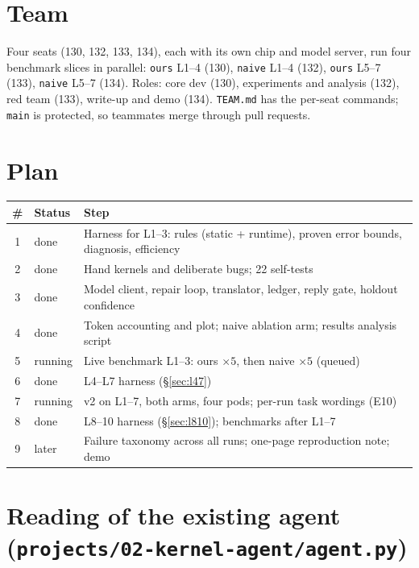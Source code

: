\documentclass[11pt]{article}
\newcommand{\code}[1]{\texttt{#1}}
\begin{document}
\section{Team}
Four seats (130, 132, 133, 134), each with its own chip and model server, run four benchmark slices
in parallel: \code{ours} L1--4 (130), \code{naive} L1--4 (132), \code{ours} L5--7 (133),
\code{naive} L5--7 (134). Roles: core dev (130), experiments and analysis (132), red team (133),
write-up and demo (134). \code{TEAM.md} has the per-seat commands; \code{main} is protected, so
teammates merge through pull requests.

\section{Plan}
\label{sec:plan}

\begin{tabularx}{\linewidth}{@{}clY@{}}
\toprule
\# & Status & Step \\
 & done & Harness for L1--3: rules (static + runtime), proven error bounds, diagnosis, efficiency \\
2 & done & Hand kernels and deliberate bugs; 22 self-tests \\
3 & done & Model client, repair loop, translator, ledger, reply gate, holdout confidence \\
4 & done & Token accounting and plot; naive ablation arm; results analysis script \\
5 & running & Live benchmark L1--3: ours $\times5$, then naive $\times5$ (queued) \\
6 & done & L4--L7 harness (\S\ref{sec:l47}) \\
7 & running & v2 on L1--7, both arms, four pods; per-run task wordings (E10) \\
8 & done & L8--10 harness (\S\ref{sec:l810}); benchmarks after L1--7 \\
9 & later & Failure taxonomy across all runs; one-page reproduction note; demo \\
\bottomrule
\end{tabularx}

\section{Reading of the existing agent (\code{projects/02-kernel-agent/agent.py})}
\label{sec:existing}
\end{document}
